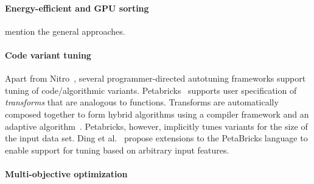 \paragraph{Energy-efficient and GPU sorting}
mention the general approaches. 

\paragraph{Code variant tuning}
Apart from Nitro~\cite{muralidharan:2014},
several programmer-directed autotuning frameworks support
tuning of code/algorithmic variants.
Petabricks~\cite{PetaBricks} 
supports user specification of \textit{transforms} that
are analogous to functions. Transforms are automatically
composed together to form hybrid algorithms using a compiler
framework and an adaptive algorithm~\cite{increa11}. Petabricks, however,
implicitly tunes variants for the size of the input data set. Ding et
al.~\cite{ding:2015} propose extensions to the PetaBricks language to
enable support for tuning based on arbitrary input features.

\paragraph{Multi-objective optimization}
